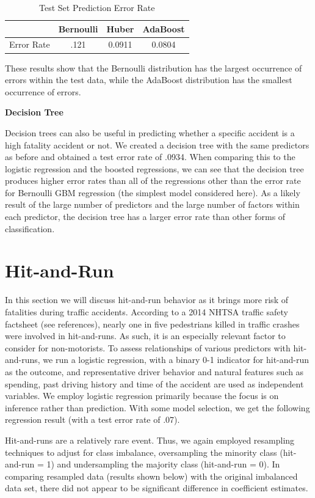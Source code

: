 \documentclass[11pt, oneside,titlepage]{article}   	%
\begin{document}
\begin{table}[H]
\centering
\begin{tabular}{cccc}
  \hline
 & Bernoulli & Huber & AdaBoost \\ 
  \hline
Error Rate & .121 & 0.0911 & 0.0804 \\ 
   \hline
\end{tabular}
\caption{Test Set Prediction Error Rate} 
\end{table}

These results show that the Bernoulli distribution has the largest occurrence of errors within the test data, while the AdaBoost distribution has the smallest occurrence of errors.

\textbf{Decision Tree}

Decision trees can also be useful in predicting whether a specific accident is a high fatality accident or not. We created a decision tree with the same predictors as before and obtained a test error rate of .0934. When comparing this to the logistic regression and the boosted regressions, we can see that the decision tree produces higher error rates than all of the regressions other than the error rate for Bernoulli GBM regression (the simplest model considered here). As a likely result of the large number of predictors and the large number of factors within each predictor, the decision tree has a larger error rate than other forms of classification.

\section*{Hit-and-Run}
In this section we will discuss hit-and-run behavior as it brings more risk of fatalities during traffic accidents. According to a 2014 NHTSA traffic safety factsheet (see references), nearly one in five pedestrians killed in traffic crashes were involved in hit-and-runs. As such, it is an especially relevant factor to consider for non-motorists. To assess relationships of various predictors with hit-and-runs, we run a logistic regression, with a binary 0-1 indicator for hit-and-run as the outcome, and representative driver behavior and natural features such as spending, past driving history and time of the accident are used as independent variables. We employ logistic regression primarily because the focus is on inference rather than prediction. With some model selection, we get the following regression result (with a test error rate of .07).

Hit-and-runs are a relatively rare event. Thus, we again employed resampling techniques to adjust for class imbalance, oversampling the minority class (hit-and-run = 1) and undersampling the majority class (hit-and-run = 0). In comparing resampled data (results shown below) with the original imbalanced data set, there did not appear to be significant difference in coefficient estimates.
\end{document}
